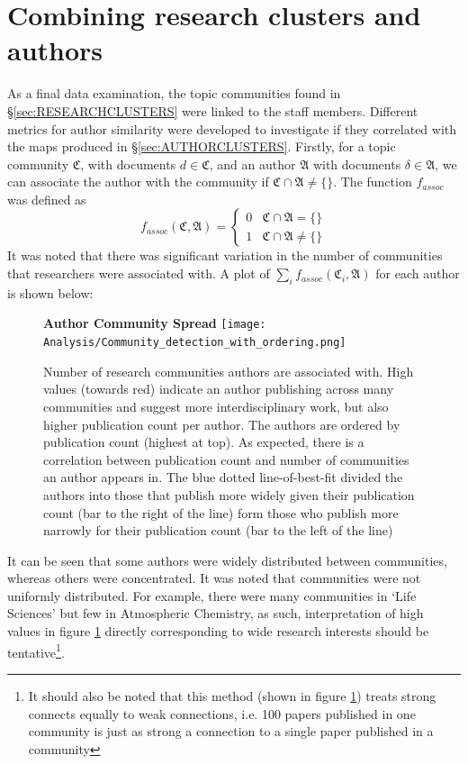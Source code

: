 \section{Combining research clusters and authors}
As a final data examination, the topic communities found in  \S\ref{sec:RESEARCHCLUSTERS} were linked to the staff members. Different metrics for author similarity were developed to investigate if they correlated with the maps produced in \S\ref{sec:AUTHORCLUSTERS}.
Firstly, for a topic community $\mathfrak{C}$, with documents $d \in \mathfrak{C}$, and an author $\mathfrak{A}$ with documents $\delta \in \mathfrak{A}$, we can associate the author with the community if $\mathfrak{C} \cap \mathfrak{A} \neq \{ \}$. The function $f_{assoc}$ was defined as 
\[ 
f_{assoc}\left( \mathfrak{C} , \mathfrak{A} \right) = \begin{cases} 
      0 & \mathfrak{C} \cap \mathfrak{A} = \{ \} \\
      1 & \mathfrak{C} \cap \mathfrak{A} \neq \{ \} 
   \end{cases}
\]
It was noted that there was significant variation in the number of communities that researchers were associated with. A plot of $\sum_i f_{assoc} \left( \mathfrak{C}_i , \mathfrak{A} \right)$ for each author is shown below:
\begin{center}
\begin{figure}[H]
  \centering
  \textbf{Author Community Spread}
    \texttt{[image: Analysis/Community\_detection\_with\_ordering.png]}
    \caption[Author community Spread]{Number of research communities authors are associated with. High values (towards red) indicate an author publishing across many communities and suggest more interdisciplinary work, but also higher publication count per author. The authors are ordered by publication count (highest at top). As expected, there is a correlation between publication count and number of communities an author appears in. The blue dotted line-of-best-fit divided the authors into those that publish more widely given their publication count (bar to the right of the line) form those who publish more narrowly for their publication count (bar to the left of the line)}
\label{fig:commbar}
\end{figure} 
\end{center}
It can be seen that some authors were widely distributed between communities, whereas others were concentrated.
It was noted that communities were not uniformly distributed. For example, there were many communities in `Life Sciences' but few in Atmospheric Chemistry, as such, interpretation of high values in figure \ref{fig:commbar} directly corresponding to wide research interests should be tentative\footnote{It should also be noted that this method (shown in figure \ref{fig:commbar}) treats strong connects equally to weak connections, i.e. 100 papers published in one community is just as strong a connection to a single paper published in a community}.

